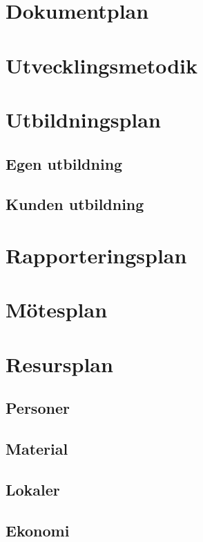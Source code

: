 \documentclass[a4paper,11pt]{article}
\begin{document}
\section{Dokumentplan}

\section{Utvecklingsmetodik}

\section{Utbildningsplan}

\subsection{Egen utbildning}

\subsection{Kunden utbildning}

\section{Rapporteringsplan}

\section{Mötesplan}

\section{Resursplan}
\subsection{Personer}
\subsection{Material}

\subsection{Lokaler}

\subsection{Ekonomi}
\end{document}
